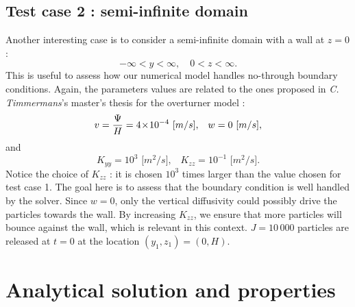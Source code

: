 \subsection{Test case 2 : semi-infinite domain}
Another interesting case is to consider a semi-infinite domain with a wall at $z=0$ :
\begin{equation}
	-\infty < y < \infty,\quad 0 < z < \infty.
\end{equation}
This is useful to assess how our numerical model handles no-through boundary conditions. Again, the parameters values are related to the ones proposed in \textit{C. Timmermans}'s master's thesis for the overturner model :
\begin{equation}
	v = \frac{\Psi}{H} = 4\!\times\!10^{-4}\mbox{ [$m/s$],}\quad  w = 0\mbox{ [$m/s$],}
\end{equation}
and
\begin{equation}
	K_{yy} = 10^{3} \mbox{ [$m^2/s$],}\quad K_{zz} = 10^{-1} \mbox{ [$m^2/s$].} 
\end{equation}
Notice the choice  of $K_{zz}$ : it is chosen $10^3$ times larger than the value chosen for test case 1. The goal here is to assess that the boundary condition is well handled by the solver. Since $w=0$, only the vertical diffusivity could possibly drive the particles towards the wall. By increasing $K_{zz}$, we ensure that more particles will bounce against the wall, which is relevant in this context. $J = 10\,000$ particles are released at $t=0$ at the location $(y_1,z_1) = (0,H)$.

\section{Analytical solution and properties}
